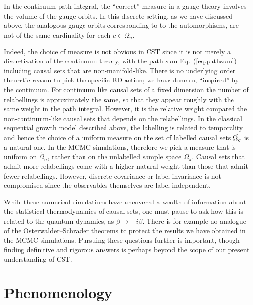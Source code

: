 {In the
continuum path integral, the ``correct'' measure in a gauge theory {involves} the volume of the gauge orbits. In this discrete setting, as we have
discussed above, the analogous gauge  orbits corresponding to 
to the automorphisms, are not of the same cardinality for each $c\in \tilde{\Omega}_n$. }

{Indeed, the choice of measure is not obvious in CST since it is not merely a discretisation of the continuum
  theory, with the  path sum Eq.~(\ref{eq:pathsum})  including  causal sets that are non-manifold-like. There  is no underlying order theoretic
  reason to pick the specific BD action; we have done so, ``inspired'' by the continuum.  For continuum like causal
  sets of a fixed dimension the number of relabellings is approximately  the same, so that they appear
  roughly with the same weight in the path integral. However, it is the relative weight compared the non-continuum-like
  causal sets that depends on the relabellings. In the classical sequential growth model described above, the
  labelling is related to temporality and hence   
  the choice of a uniform measure on the set of labelled causal sets $\tilde {\Omega_g}$ is a natural one.
In the MCMC simulations,
therefore we pick  a measure }  that is uniform on $\tilde{\Omega}_n$, rather than on the unlabelled sample space $\Omega_n$. Causal
sets that admit more relabellings come with a higher natural weight than those that admit fewer relabellings.  However,
{discrete} 
covariance {or label invariance} is not compromised since the observables themselves are label independent. 

While these numerical simulations have uncovered a wealth of information about the statistical thermodynamics of causal
sets, one must pause to ask how this is related to the quantum dynamics, as $\beta \rightarrow -i \beta$.  
There is for example no analogue of the Osterwalder--Schrader theorems to protect the results we have obtained in the
MCMC simulations.  Pursuing
these questions further is important, though finding definitive and rigorous answers is perhaps beyond the scope of our
present understanding of CST. 




\section{Phenomenology} 
\label{sec:phen} 


